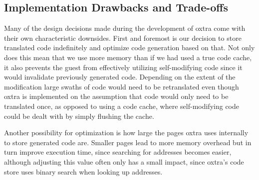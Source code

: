 \subsection{Implementation Drawbacks and Trade-offs}
Many of the design decisions made during the development of oxtra come with their own characteristic downsides. First and foremost is our decision to store translated code indefinitely and optimize code generation based on that. Not only does this mean that we use more memory than if we had used a true code cache, it also prevents the guest from effectively utilizing self-modifying code since it would invalidate previously generated code. Depending on the extent of the modification large swaths of code would need to be retranslated even though oxtra is implemented on the assumption that code would only need to be translated once, as opposed to using a code cache, where self-modifying code could be dealt with by simply flushing the cache.

Another possibility for optimization is how large the pages oxtra uses internally to store generated code are. Smaller pages lead to more memory overhead but in turn improve execution time, since searching for addresses becomes easier, although adjusting this value often only has a small impact, since oxtra's code store uses binary search when looking up addresses.
